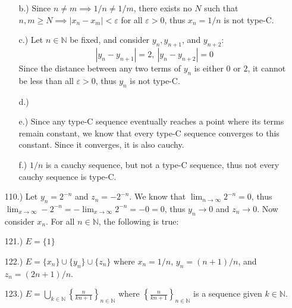 \documentclass[12pt]{article}
\newcommand{\vertb}[1]{\left\vert#1\right\vert}
\newcommand{\e}{\varepsilon}
\newcommand{\lm}[1]{\displaystyle\lim_{#1}}
\begin{document}
\begin{itemize}
\begin{itemize}
        \item [b.)] Since $n\neq m\implies1/n\ne1/m$, there exists no $N$ such that $n,m\geq N\implies\vertb{x_n-x_m}<\e$ for all $\e>0$, thus $x_n=1/n$ is not type-C.

        \item [c.)] Let $n\in\mathbb{N}$ be fixed, and consider $y_n,y_{n+1}$, and $y_{n+2}$:
        \[\vertb{y_n-y_{n+1}}=2,\ \vertb{y_n-y_{n+2}}=0\]
        Since the distance between any two terms of $y_n$ is either $0$ or $2$, it cannot be less than all $\e>0$, thus $y_n$ is not type-C.

        \item [d.)] 

        \item [e.)] Since any type-C sequence eventually reaches a point where its terms remain constant, we know that every type-C sequence converges to this constant. Since it converges, it is also cauchy.

        \item [f.)] $1/n$ is a cauchy sequence, but not a type-C sequence, thus not every cauchy sequence is type-C.
    \end{itemize}

    \item [110.)] Let $y_n=2^{-n}$ and $z_n=-2^{-n}$. We know that $\lm{n\to\infty}2^{-n}=0$, thus $\lm{x\to\infty}-2^{-n}=-\lm{x\to\infty}2^{-n}=-0=0$, thus $y_n\to0$ and $z_n\to0$. Now consider $x_n$. For all $n\in\mathbb{N}$, the following is true:






    \item [121.)] $E=\{1\}$

    \item [122.)] $E=\{x_n\}\cup\{y_n\}\cup\{z_n\}$ where $x_n=1/n$, $y_n=(n+1)/n$, and $z_n=(2n+1)/n$.

    \item [123.)] $E=\displaystyle\bigcup_{k\in\mathbb{N}}\left\{\frac{n}{kn+1}\right\}_{n\in\mathbb{N}}$ where $\displaystyle\left\{\frac{n}{kn+1}\right\}_{n\in\mathbb{N}}$ is a sequence given $k\in\mathbb{N}$.


\end{itemize}
\end{document}

